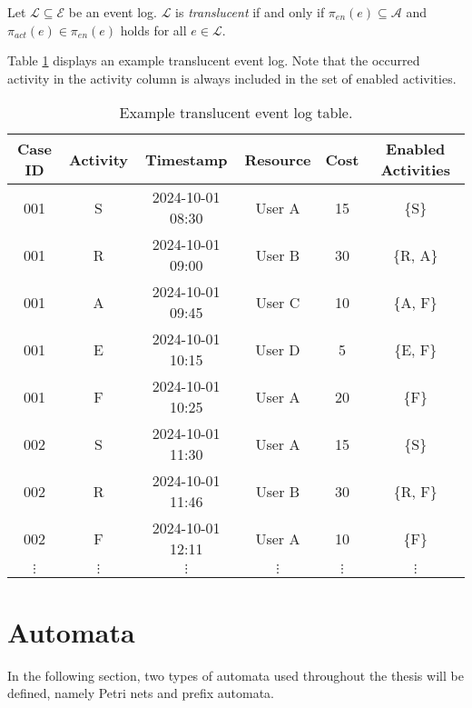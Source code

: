 \begin{definition}
    Let $\mathcal{L} \subseteq \mathcal{E}$ be an event log. $\mathcal{L}$ is \emph{translucent} if and only if $\pi_{en}(e) \subseteq \mathcal{A}$ and $\pi_{act}(e) \in \pi_{en}(e)$ holds for all $e \in \mathcal{L}$.
\end{definition}

Table \ref{tab:translucent_event_log} displays an example translucent event log. Note that the occurred activity in the activity column is always included in the set of enabled activities.

\renewcommand{\arraystretch}{1.25}
\begin{table}[h]
    \centering
    \caption{Example translucent event log table.}
    \begin{tabular}{|c|c|c|c|c|c|}
        \hline
        \textbf{Case ID} & \textbf{Activity} & \textbf{Timestamp} & \textbf{Resource} & \textbf{Cost} & \textbf{Enabled Activities} \\ 
        \hline
        001 & S  & 2024-10-01 08:30 & User A & 15 & \{S\}\\ 
        001 & R    & 2024-10-01 09:00 & User B & 30 & \{R, A\}\\ 
        001 & A & 2024-10-01 09:45 & User C & 10 & \{A, F\}\\ 
        001 & E     & 2024-10-01 10:15 & User D & 5  & \{E, F\}\\ 
        001 & F & 2024-10-01 10:25 & User A & 20 & \{F\}\\
        002 & S  & 2024-10-01 11:30 & User A & 15 & \{S\}\\ 
        002 & R    & 2024-10-01 11:46 & User B & 30 & \{R, F\}\\ 
        002 & F & 2024-10-01 12:11 & User A & 10 & \{F\}\\ 
        $\vdots$ & $\vdots$ & $\vdots$ & $\vdots$ & $\vdots$ & $\vdots$ \\
        \hline
    \end{tabular}
    \label{tab:translucent_event_log}
\end{table}


\section{Automata}

In the following section, two types of automata used throughout the thesis will be defined, namely Petri nets and prefix automata.

